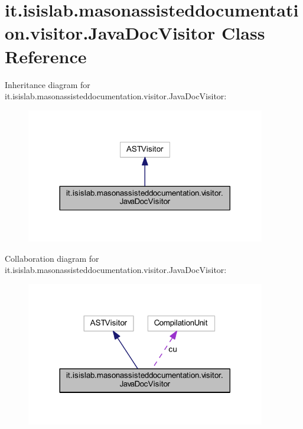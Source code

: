 \hypertarget{classit_1_1isislab_1_1masonassisteddocumentation_1_1visitor_1_1_java_doc_visitor}{\section{it.\-isislab.\-masonassisteddocumentation.\-visitor.\-Java\-Doc\-Visitor Class Reference}
\label{classit_1_1isislab_1_1masonassisteddocumentation_1_1visitor_1_1_java_doc_visitor}
}


Inheritance diagram for it.\-isislab.\-masonassisteddocumentation.\-visitor.\-Java\-Doc\-Visitor\-:
\nopagebreak
\begin{figure}[H]
\begin{center}
\leavevmode
\includegraphics[width=296pt]{classit_1_1isislab_1_1masonassisteddocumentation_1_1visitor_1_1_java_doc_visitor__inherit__graph}
\end{center}
\end{figure}


Collaboration diagram for it.\-isislab.\-masonassisteddocumentation.\-visitor.\-Java\-Doc\-Visitor\-:
\nopagebreak
\begin{figure}[H]
\begin{center}
\leavevmode
\includegraphics[width=296pt]{classit_1_1isislab_1_1masonassisteddocumentation_1_1visitor_1_1_java_doc_visitor__coll__graph}
\end{center}
\end{figure}
